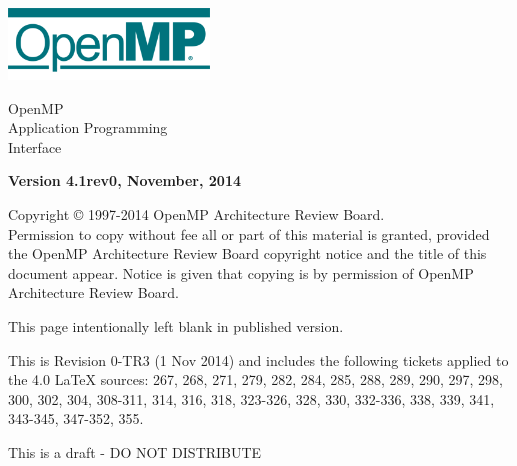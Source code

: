 
  \begin{titlepage}
    \begin{flushleft}
     \hspace{-6em} \includegraphics[width=0.4\textwidth]{openmp-logo.png}
    \end{flushleft}

    \begin{adjustwidth}{-0.75in}{0in}
    \begin{center}
      \Huge
      \textsf{OpenMP\\Application Programming\\Interface}

      \vspace{0.5in}\textsf{    }\vspace{-0.7in}
      \normalsize

      \vspace{1.0in}

      \textbf{Version 4.1rev0, November, 2014}
    \end{center}
    \end{adjustwidth}

    \vspace{3.0in}

\begin{adjustwidth}{0pt}{1em}\setlength{\parskip}{0.25\baselineskip}%
Copyright © 1997-2014 OpenMP Architecture Review Board.\\
Permission to copy without fee all or part of this material is granted,
provided the OpenMP Architecture Review Board copyright notice and
the title of this document appear. Notice is given that copying is by
permission of OpenMP Architecture Review Board.\end{adjustwidth}

  \end{titlepage}


\clearpage
\thispagestyle{empty}
\phantom{a}
This page intentionally left blank in published version.

This is Revision 0-TR3 (1 Nov 2014) and includes the following tickets applied to the 4.0 LaTeX sources:
267, 268, 271, 279, 282, 284, 285, 288, 289, 290, 297, 298, 300, 302, 304, 308-311, 314, 316, 318, 323-326, 328, 330, 332-336, 338, 339, 341, 343-345, 347-352, 355. 

This is a draft - DO NOT DISTRIBUTE
\vfill


